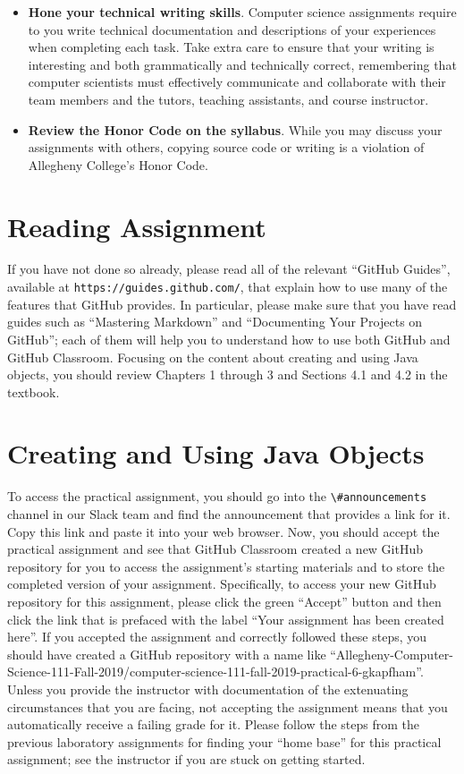 \documentclass[11pt]{article}
\newcommand{\url}[1]{\lstinline{#1}}
\newcommand{\channel}[1]{\lstinline{#1}}
\begin{document}
\begin{itemize}
\item {\bf Hone your technical writing skills}. Computer science assignments
  require to you write technical documentation and descriptions of your
  experiences when completing each task. Take extra care to ensure that your
  writing is interesting and both grammatically and technically correct,
  remembering that computer scientists must effectively communicate and
  collaborate with their team members and the tutors, teaching assistants, and
  course instructor.

\item {\bf Review the Honor Code on the syllabus}. While you may discuss your
  assignments with others, copying source code or writing is a violation of
  Allegheny College's Honor Code.

\end{itemize}

\section*{Reading Assignment}

If you have not done so already, please read all of the relevant ``GitHub
Guides'', available at \url{https://guides.github.com/}, that explain how to use
many of the features that GitHub provides. In particular, please make sure that
you have read guides such as ``Mastering Markdown'' and ``Documenting Your
Projects on GitHub''; each of them will help you to understand how to use both
GitHub and GitHub Classroom. Focusing on the content about creating and using
Java objects, you should review Chapters 1 through 3 and Sections 4.1 and 4.2 in
the textbook.

\section*{Creating and Using Java Objects}

To access the practical assignment, you should go into the
\channel{\#announcements} channel in our Slack team and find the announcement
that provides a link for it. Copy this link and paste it into your web browser.
Now, you should accept the practical assignment and see that GitHub Classroom
created a new GitHub repository for you to access the assignment's starting
materials and to store the completed version of your assignment. Specifically,
to access your new GitHub repository for this assignment, please click the green
``Accept'' button and then click the link that is prefaced with the label ``Your
assignment has been created here''. If you accepted the assignment and correctly
followed these steps, you should have created a GitHub repository with a name
like
``Allegheny-Computer-Science-111-Fall-2019/computer-science-111-fall-2019-practical-6-gkapfham''.
Unless you provide the instructor with documentation of the extenuating
circumstances that you are facing, not accepting the assignment means that you
automatically receive a failing grade for it. Please follow the steps from the
previous laboratory assignments for finding your ``home base'' for this
practical assignment; see the instructor if you are stuck on getting started.
\end{document}

